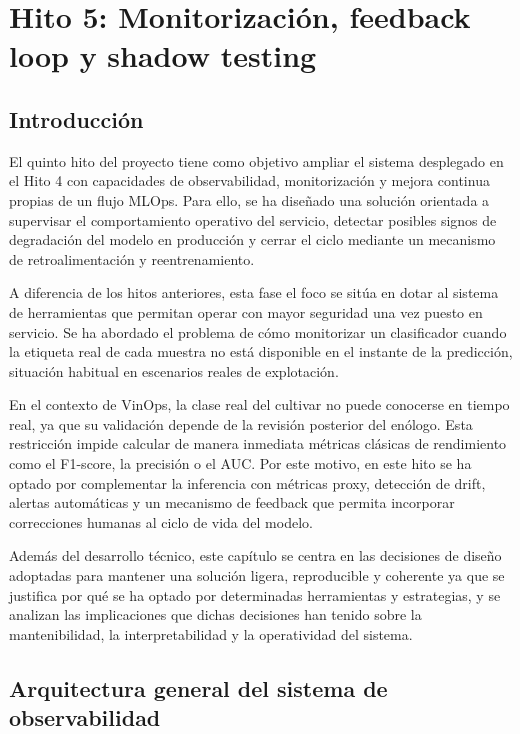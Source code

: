 \chapter{Hito 5: Monitorización, feedback loop y shadow testing}
\label{chap:hito5}

\section{Introducción}

El quinto hito del proyecto tiene como objetivo ampliar el sistema desplegado en el Hito 4 con capacidades de observabilidad, monitorización y mejora continua propias de un flujo MLOps. Para ello, se ha diseñado una solución orientada a supervisar el comportamiento operativo del servicio, detectar posibles signos de degradación del modelo en producción y cerrar el ciclo mediante un mecanismo de retroalimentación y reentrenamiento.

A diferencia de los hitos anteriores, esta fase el foco se sitúa en dotar al sistema de herramientas que permitan operar con mayor seguridad una vez puesto en servicio. Se ha abordado el problema de cómo monitorizar un clasificador cuando la etiqueta real de cada muestra no está disponible en el instante de la predicción, situación habitual en escenarios reales de explotación.

En el contexto de VinOps, la clase real del cultivar no puede conocerse en tiempo real, ya que su validación depende de la revisión posterior del enólogo. Esta restricción impide calcular de manera inmediata métricas clásicas de rendimiento como el F1-score, la precisión o el AUC. Por este motivo, en este hito se ha optado por complementar la inferencia con métricas proxy, detección de drift, alertas automáticas y un mecanismo de feedback que permita incorporar correcciones humanas al ciclo de vida del modelo.

Además del desarrollo técnico, este capítulo se centra en las decisiones de diseño adoptadas para mantener una solución ligera, reproducible y coherente ya que se justifica por qué se ha optado por determinadas herramientas y estrategias, y se analizan las implicaciones que dichas decisiones han tenido sobre la mantenibilidad, la interpretabilidad y la operatividad del sistema.

\section{Arquitectura general del sistema de observabilidad}

